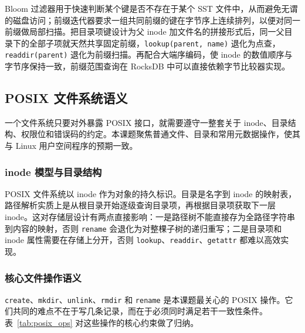 Bloom 过滤器用于快速判断某个键是否不存在于某个 SST 文件中，从而避免无谓的磁盘访问；前缀迭代器要求一组共同前缀的键在字节序上连续排列，以便对同一前缀做局部扫描。把目录项键设计为父 inode 加文件名的拼接形式后，同一父目录下的全部子项就天然共享固定前缀，\texttt{lookup(parent, name)} 退化为点查，\texttt{readdir(parent)} 退化为前缀扫描。再配合大端序编码，使 inode 的数值顺序与字节序保持一致，前缀范围查询在 RocksDB 中可以直接依赖字节比较器实现。

\subsection{POSIX 文件系统语义}

一个文件系统只要对外暴露 POSIX 接口，就需要遵守一整套关于 inode、目录结构、权限位和错误码的约定。本课题聚焦普通文件、目录和常用元数据操作，使其与 Linux 用户空间程序的预期一致。

\subsubsection{inode 模型与目录结构}

POSIX 文件系统以 inode 作为对象的持久标识。目录是名字到 inode 的映射表，路径解析实质上是从根目录开始逐级查询目录项，再根据目录项获取下一层 inode。这对存储层设计有两点直接影响：一是路径树不能直接存为全路径字符串到内容的映射，否则 \texttt{rename} 会退化为对整棵子树的递归重写；二是目录项和 inode 属性需要在存储上分开，否则 \texttt{lookup}、\texttt{readdir}、\texttt{getattr} 都难以高效实现。

\subsubsection{核心文件操作语义}

\texttt{create}、\texttt{mkdir}、\texttt{unlink}、\texttt{rmdir} 和 \texttt{rename} 是本课题最关心的 POSIX 操作。它们共同的难点不在于写几条记录，而在于必须同时满足若干一致性条件。表~\ref{tab:posix_ops} 对这些操作的核心约束做了归纳。

